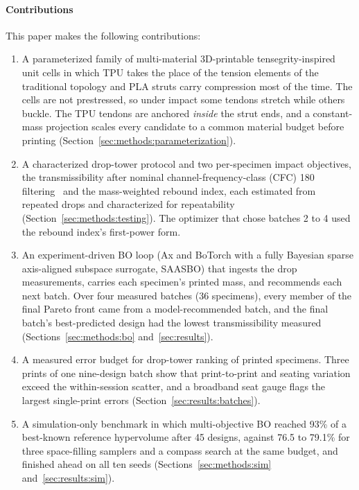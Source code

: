 \documentclass[11pt]{article}
\begin{document}
\paragraph*{Contributions} This paper makes the following contributions:
\begin{enumerate}
  \item A parameterized family of multi-material 3D-printable
    tensegrity-inspired unit cells in which TPU takes the place of the
    tension elements of the traditional topology and PLA struts carry
    compression most of the time. The cells are not prestressed, so
    under impact some tendons stretch while others buckle. The TPU
    tendons are anchored \emph{inside} the strut ends, and a
    constant-mass projection scales every candidate to a common
    material budget before printing
    (Section~\ref{sec:methods:parameterization}).
  \item A characterized drop-tower protocol and two per-specimen impact
    objectives, the transmissibility after nominal channel-frequency-class
    (CFC) 180 filtering~\citep{saej211} and the mass-weighted rebound
    index, each estimated from repeated drops and characterized for
    repeatability (Section~\ref{sec:methods:testing}). The optimizer that
    chose batches 2 to 4 used the rebound index's first-power form.
  \item An experiment-driven BO loop (Ax and BoTorch with a fully
    Bayesian sparse axis-aligned subspace surrogate, SAASBO) that ingests
    the drop measurements, carries each specimen's printed mass, and
    recommends each next batch. Over four measured batches
    (36 specimens), every member of the final Pareto front came from a
    model-recommended batch, and the final batch's best-predicted design
    had the lowest transmissibility measured
    (Sections~\ref{sec:methods:bo} and~\ref{sec:results}).
  \item A measured error budget for drop-tower ranking of printed
    specimens. Three prints of one nine-design batch show that
    print-to-print and seating variation exceed the within-session
    scatter, and a broadband seat gauge flags the largest single-print
    errors (Section~\ref{sec:results:batches}).
  \item A simulation-only benchmark in which multi-objective BO reached
    93\% of a best-known reference hypervolume after 45 designs, against
    76.5 to 79.1\% for three space-filling samplers and a compass search at the same budget,
    and finished ahead on all ten seeds (Sections~\ref{sec:methods:sim}
    and~\ref{sec:results:sim}).
\end{enumerate}
\end{document}
